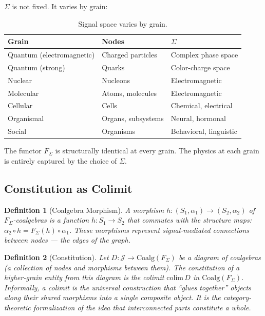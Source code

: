 \documentclass[12pt,a4paper]{article}
\newtheorem{definition}{Definition}
\begin{document}
$\Sigma$ is not fixed. It varies by grain:

\begin{table}[htbp]
\centering
\begin{tabular}{@{}lll@{}}
\toprule
Grain & Nodes & $\Sigma$ \\
\midrule
Quantum (electromagnetic) & Charged particles & Complex phase space \\
Quantum (strong) & Quarks & Color-charge space \\
Nuclear & Nucleons & Electromagnetic \\
Molecular & Atoms, molecules & Electromagnetic \\
Cellular & Cells & Chemical, electrical \\
Organismal & Organs, subsystems & Neural, hormonal \\
Social & Organisms & Behavioral, linguistic \\
\bottomrule
\end{tabular}
\caption{Signal space varies by grain.}
\label{tab:signal-space}
\end{table}

The functor $F_\Sigma$ is structurally identical at every grain. The physics at each grain is entirely captured by the choice of $\Sigma$.

\subsection{Constitution as Colimit}
\label{sec:constitution}

\begin{definition}[Coalgebra Morphism]
\label{def:morphism}
A morphism $h : (S_1, \alpha_1) \to (S_2, \alpha_2)$ of $F_\Sigma$-coalgebras is a function $h : S_1 \to S_2$ that commutes with the structure maps: $\alpha_2 \circ h = F_\Sigma(h) \circ \alpha_1$. These morphisms represent signal-mediated connections between nodes --- the edges of the graph.
\end{definition}

\begin{definition}[Constitution]
\label{def:constitution}
Let $D : \mathcal{J} \to \text{Coalg}(F_\Sigma)$ be a diagram of coalgebras (a collection of nodes and morphisms between them). The \emph{constitution} of a higher-grain entity from this diagram is the colimit $\text{colim}\, D$ in $\text{Coalg}(F_\Sigma)$. Informally, a colimit is the universal construction that ``glues together'' objects along their shared morphisms into a single composite object. It is the category-theoretic formalization of the idea that interconnected parts constitute a whole.
\end{definition}
\end{document}
